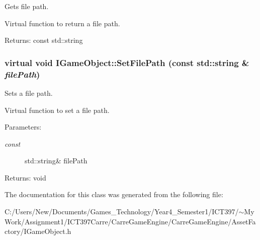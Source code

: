 Gets file path. 

Virtual function to return a file path.

\begin{Desc}
\item[Returns:]const std::string \end{Desc}
\hypertarget{class_i_game_object_4ff2c43df492113b7b51ce68d965defa}{
\subsubsection[SetFilePath]{\setlength{\rightskip}{0pt plus 5cm}virtual void IGameObject::SetFilePath (const std::string \& {\em filePath})}}
\label{class_i_game_object_4ff2c43df492113b7b51ce68d965defa}


Sets a file path. 

Virtual function to set a file path.

\begin{Desc}
\item[Parameters:]
\begin{description}
\item[{\em const}]std::string\& filePath \end{description}
\end{Desc}
\begin{Desc}
\item[Returns:]void \end{Desc}


The documentation for this class was generated from the following file:\begin{CompactItemize}
\item 
C:/Users/New/Documents/Games\_\-Technology/Year4\_\-Semester1/ICT397/$\sim$My Work/Assignment1/ICT397Carre/CarreGameEngine/CarreGameEngine/AssetFactory/IGameObject.h\end{CompactItemize}
